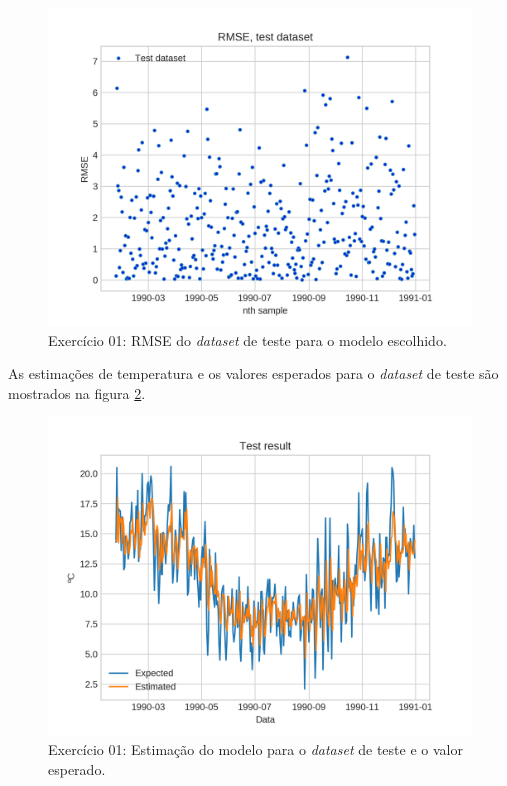 \documentclass{article}
\begin{document}
   \begin{figure}[!h]
        \centering
        \includegraphics[width=\linewidth]{ex01/model.png}
        \caption{Exercício 01: RMSE do \textit{dataset} de teste para o modelo escolhido.}
        \label{fig:ex1_kfold_rmse}
    \end{figure}
    As estimações de temperatura e os valores esperados para o \textit{dataset} de teste são
    mostrados na figura \ref{fig:ex1_model_comp}.
    \begin{figure}[!h]
        \centering
        \includegraphics[width=\linewidth]{ex01/model_comp.png}
        \caption{Exercício 01: Estimação do modelo para o \textit{dataset} de teste e o valor esperado.}
        \label{fig:ex1_model_comp}
    \end{figure}
    
\end{document}
